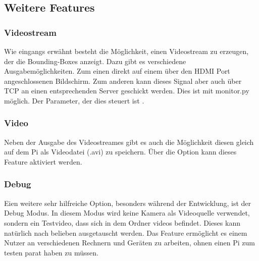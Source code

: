 \subsection{Weitere Features}

\subsubsection{Videostream}
Wie eingangs erwähnt besteht die Möglichkeit, einen Videostream zu erzeugen, der die Bounding-Boxes anzeigt. Dazu gibt es verschiedene Ausgabemöglichkeiten. Zum einen direkt auf einem über den HDMI Port angeschlossenen Bildschirm. Zum anderen kann dieses Signal aber auch über TCP an einen entsprechenden Server geschickt werden. Dies ist mit monitor.py möglich.
Der Parameter, der dies steuert ist .
\subsubsection{Video}
Neben der Ausgabe des Videostreames gibt es auch die Möglichkeit diesen gleich auf dem Pi als Videodatei (.avi) zu speichern. Über die Option  kann dieses Feature aktiviert werden.

\subsubsection{Debug}
Eien weitere sehr hilfreiche Option, besonders während der Entwicklung, ist der Debug Modus. In diesem Modus wird keine Kamera als Videoquelle verwendet, sondern ein Testvideo, dass sich in dem Ordner videos befindet. Dieses kann natürlich nach belieben ausgetauscht werden. Das Feature ermöglicht es einem Nutzer an verschiedenen Rechnern und Geräten zu arbeiten, ohnen einen Pi zum testen parat haben zu müssen.
